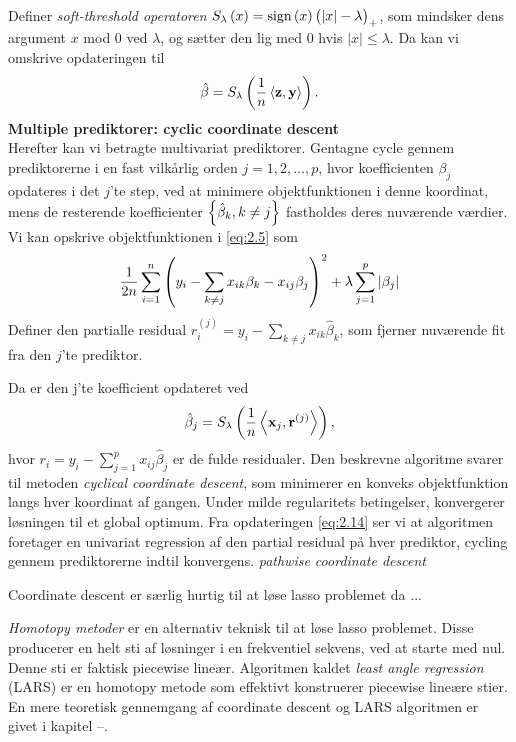 Definer \textit{soft-threshold operatoren} $S_\lambda\del{x}=\text{sign}\del{x} \del{\vert x \vert - \lambda}_+$, som mindsker dens argument $x$ mod 0 ved $\lambda$, og sætter den lig med 0 hvis $\vert x \vert \leq \lambda$. Da kan vi omskrive opdateringen til
\begin{align*}
\hat{\beta} = S_\lambda \del{\frac{1}{n} \left\langle \mathbf{z}, \mathbf{y} \right\rangle}.
\end{align*}
%
\textbf{Multiple prediktorer: cyclic coordinate descent} \\
Herefter kan vi betragte multivariat prediktorer. 
Gentagne cycle gennem prediktorerne i en fast vilkårlig orden $j=1, 2, \ldots, p$, hvor koefficienten $\beta_j$ opdateres i det $j$'te step, ved at minimere objektfunktionen i denne koordinat, mens de resterende koefficienter $\cbr{\hat{\beta}_k, k \neq j}$ fastholdes deres nuværende værdier. 
Vi kan opskrive objektfunktionen i \eqref{eq:2.5} som
\begin{align*}
\frac{1}{2n} \sum_{i=1}^n \del{y_i - \sum_{k \neq j} x_{ik} \beta_k - x_{ij} \beta_j}^2 + \lambda \sum_{j = 1}^p \vert \beta_j \vert
\end{align*}
Definer den partialle residual $r_i^{(j)}=y_i - \sum_{k \neq j} x_{ik} \hat{\beta}_k$, som fjerner nuværende fit fra den $j$'te prediktor.


Da er den j'te koefficient opdateret ved
\begin{align}
\hat{\beta}_j = S_\lambda \del{\frac{1}{n} \left\langle \mathbf{x}_j, \mathbf{r}^{(j)} \right\rangle}, \label{eq:2.14}
\end{align}
hvor \(r_i = y_i - \sum_{j = 1}^p x_{ij} \hat{\beta}_j \) er de fulde residualer.
Den beskrevne algoritme svarer til metoden \textit{cyclical coordinate descent}, som minimerer en konveks objektfunktion langs hver koordinat af gangen.
Under milde regularitets betingelser, konvergerer løsningen til et global optimum.
Fra opdateringen \eqref{eq:2.14} ser vi at algoritmen foretager en univariat regression af den partial residual på hver prediktor, cycling gennem prediktorerne indtil konvergens.
\textit{pathwise coordinate descent}

Coordinate descent er særlig hurtig til at løse lasso problemet da ...

\textit{Homotopy metoder} er en alternativ teknisk til at løse lasso problemet. Disse producerer en helt sti af løsninger i en frekventiel sekvens, ved at starte med nul.
Denne sti er faktisk piecewise lineær.
Algoritmen kaldet \textit{least angle regression} (LARS) er en homotopy metode som effektivt konstruerer piecewise lineære stier.
En mere teoretisk gennemgang af coordinate descent og LARS algoritmen er givet i kapitel --. 


